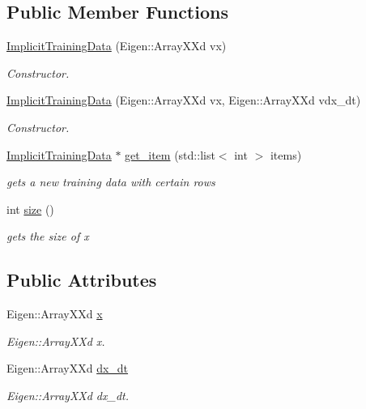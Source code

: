 \subsection*{Public Member Functions}
\begin{DoxyCompactItemize}
\item 
\hyperlink{structImplicitTrainingData_a517aa36137750f3d4299491b030b7431}{Implicit\+Training\+Data} (Eigen\+::\+Array\+X\+Xd vx)\hypertarget{structImplicitTrainingData_a517aa36137750f3d4299491b030b7431}{}\label{structImplicitTrainingData_a517aa36137750f3d4299491b030b7431}

\begin{DoxyCompactList}\small\item\em Constructor. \end{DoxyCompactList}\item 
\hyperlink{structImplicitTrainingData_a5bea19d7ebed073cab7dbad3a0aeaeb2}{Implicit\+Training\+Data} (Eigen\+::\+Array\+X\+Xd vx, Eigen\+::\+Array\+X\+Xd vdx\+\_\+dt)\hypertarget{structImplicitTrainingData_a5bea19d7ebed073cab7dbad3a0aeaeb2}{}\label{structImplicitTrainingData_a5bea19d7ebed073cab7dbad3a0aeaeb2}

\begin{DoxyCompactList}\small\item\em Constructor. \end{DoxyCompactList}\item 
\hyperlink{structImplicitTrainingData}{Implicit\+Training\+Data} $\ast$ \hyperlink{structImplicitTrainingData_a91e92604cc19a693ac89eb7dbd9fab80}{get\+\_\+item} (std\+::list$<$ int $>$ items)
\begin{DoxyCompactList}\small\item\em gets a new training data with certain rows \end{DoxyCompactList}\item 
int \hyperlink{structImplicitTrainingData_aa3be8b04a160fb496668bba52507d3e4}{size} ()
\begin{DoxyCompactList}\small\item\em gets the size of x \end{DoxyCompactList}\end{DoxyCompactItemize}
\subsection*{Public Attributes}
\begin{DoxyCompactItemize}
\item 
Eigen\+::\+Array\+X\+Xd \hyperlink{structImplicitTrainingData_a7d797c666ce6c25d2f816e01ed4f3aed}{x}
\begin{DoxyCompactList}\small\item\em Eigen\+::\+Array\+X\+Xd x. \end{DoxyCompactList}\item 
Eigen\+::\+Array\+X\+Xd \hyperlink{structImplicitTrainingData_a46e7205b1b43da1e0b6b582b3d127a2e}{dx\+\_\+dt}
\begin{DoxyCompactList}\small\item\em Eigen\+::\+Array\+X\+Xd dx\+\_\+dt. \end{DoxyCompactList}\end{DoxyCompactItemize}


